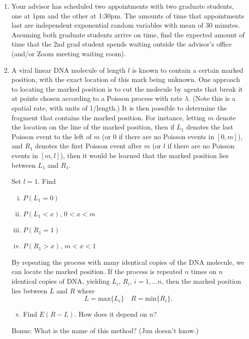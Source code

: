 \documentclass[12pt,letterpaper]{article}
\begin{document}
\begin{enumerate}


\item Your advisor has scheduled two appointments with two graduate students, one at 1pm and the other at 1:30pm. The amounts of time that appointments last are independent exponential random variables with mean of 30 minutes. Assuming both graduate students arrive on time, find the expected amount of time that the 2nd grad student spends waiting outside the advisor's office (and/or Zoom meeting waiting room).


\item A viral linear DNA molecule of length $l$ is known to contain a certain marked position, with the exact location of this mark being unknown. One approach to locating the marked position is to cut the molecule by agents that break it at points chosen according to a Poisson process with rate $\lambda$. (Note this is a spatial rate, with units of 1/length.) It is then possible to determine the fragment that contains the marked position. For instance, letting $m$ denote the location on the line of the marked position, then if $L_1$ denotes the last Poisson event to the left of $m$ (or $0$ if there are no Poisson events in $[0,m]$), and $R_1$ denotes the first Poisson event after $m$ (or $l$ if there are no Poisson events in $[m,l]$), then it would be learned that the marked position lies between $L_1$ and $R_1$.

Set $l=1$. Find
\begin{enumerate}[i.]
\item $P(L_1=0)$
\item $P(L_1<x)$, $0<x<m$
\item $P(R_1=1)$
\item $P(R_1> x)$, $m<x<1$
\end{enumerate}
By repeating the process with many identical copies of the DNA molecule, we can locate the marked position. If the process is repeated $n$ times on $n$ identical copies of DNA, yielding $L_i$, $R_i$, $i=1,...n$, then the marked position lies between $L$ and $R$ where
\begin{equation}
L = \mbox{max}\{L_i\} \quad R = \mbox{min}\{R_i\}.
\end{equation}
\begin{enumerate}[i.]
  \setcounter{enumii}{4}
\item Find $E(R-L)$. How does it depend on $n$?
\end{enumerate}
Bonus: What is the name of this method? (Jun doesn't know.)




\end{enumerate}
\end{document}
